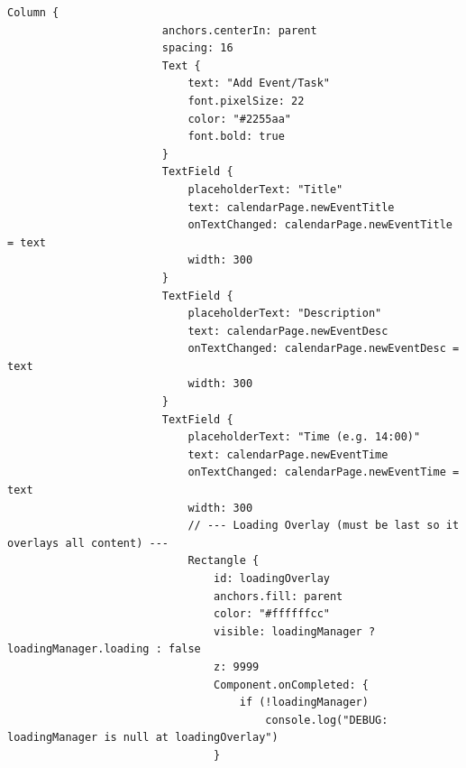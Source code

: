 \documentclass{report}
\begin{document}
\begin{lstlisting}[style=qmlstyle]
                    Column {
                        anchors.centerIn: parent
                        spacing: 16
                        Text {
                            text: "Add Event/Task"
                            font.pixelSize: 22
                            color: "#2255aa"
                            font.bold: true
                        }
                        TextField {
                            placeholderText: "Title"
                            text: calendarPage.newEventTitle
                            onTextChanged: calendarPage.newEventTitle = text
                            width: 300
                        }
                        TextField {
                            placeholderText: "Description"
                            text: calendarPage.newEventDesc
                            onTextChanged: calendarPage.newEventDesc = text
                            width: 300
                        }
                        TextField {
                            placeholderText: "Time (e.g. 14:00)"
                            text: calendarPage.newEventTime
                            onTextChanged: calendarPage.newEventTime = text
                            width: 300
                            // --- Loading Overlay (must be last so it overlays all content) ---
                            Rectangle {
                                id: loadingOverlay
                                anchors.fill: parent
                                color: "#ffffffcc"
                                visible: loadingManager ? loadingManager.loading : false
                                z: 9999
                                Component.onCompleted: {
                                    if (!loadingManager)
                                        console.log("DEBUG: loadingManager is null at loadingOverlay")
                                }
                        

\end{lstlisting}
\end{document}
